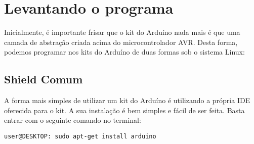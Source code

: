 \section{Levantando o programa}\label{program}

Inicialmente, é importante frisar que o kit do Arduíno nada mais é que uma camada de abstração criada acima do microcontrolador AVR. Desta forma, podemos programar nos kits do Arduíno de duas formas sob o sistema Linux:

\subsection{Shield Comum}\label{noob}

A forma mais simples de utilizar um kit do Arduíno é utilizando a própria IDE oferecida para o kit. A sua instalação é bem simples e fácil de ser feita. Basta entrar com o seguinte comando no terminal:



\begin{lstlisting}[style=Bash]
user@DESKTOP: sudo apt-get install arduino
\end{lstlisting}
